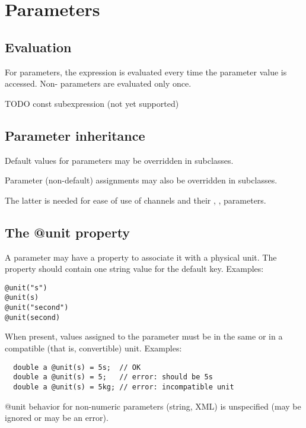 \section{Parameters}

\subsection{Evaluation}

For  parameters, the expression is evaluated every time the
parameter value is accessed. Non- parameters are evaluated only once.

TODO const subexpression (not yet supported)


\subsection{Parameter inheritance}

Default values for parameters may be overridden in subclasses.

Parameter (non-default) assignments may also be overridden in subclasses.

\begin{rationale}
    The latter is needed for ease of use of channels and their ,
    ,  parameters.
\end{rationale}

\subsection{The @unit property}

A parameter may have a  property to associate it with a physical
unit. The  property should contain one string value for the default
key. Examples:

\begin{verbatim}
@unit("s")
@unit(s)
@unit("second")
@unit(second)
\end{verbatim}

When present, values assigned to the parameter must be in the
same or in a compatible (that is, convertible) unit.
Examples:

\begin{verbatim}
  double a @unit(s) = 5s;  // OK
  double a @unit(s) = 5;   // error: should be 5s
  double a @unit(s) = 5kg; // error: incompatible unit
\end{verbatim}

@unit behavior for non-numeric parameters (string, XML) is unspecified
(may be ignored or may be an error).

